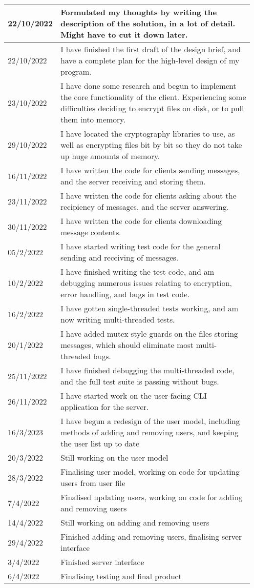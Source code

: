 \documentclass{article}
\begin{document}
{\begin{longtable}{p{}p{}}
\midrule
22/10/2022 & Formulated my thoughts by writing the description of the solution, in a lot of detail. Might have to cut it down later.\\
\midrule
22/10/2022 & I have finished the first draft of the design brief, and have a complete plan for the high-level design of my program.\\
\midrule
23/10/2022 & I have done some research and begun to implement the core functionality of the client. Experiencing some difficulties deciding to encrypt files on disk, or to pull them into memory.\\
\midrule
29/10/2022 & I have located the cryptography libraries to use, as well as encrypting files bit by bit so they do not take up huge amounts of memory.\\
\midrule
16/11/2022 & I have written the code for clients sending messages, and the server receiving and storing them.\\
\midrule
23/11/2022 & I have written the code for clients asking about the recipiency of messages, and the server answering.\\
\midrule
30/11/2022 & I have written the code for clients downloading message contents.\\
\midrule
05/2/2022 & I have started writing test code for the general sending and receiving of messages.\\
\midrule
10/2/2022 & I have finished writing the test code, and am debugging numerous issues relating to encryption, error handling, and bugs in test code.\\
\midrule
16/2/2022 & I have gotten single-threaded tests working, and am now writing multi-threaded tests.\\
\midrule
20/1/2022 & I have added mutex-style guards on the files storing messages, which should eliminate most multi-threaded bugs.\\
\midrule
25/11/2022 & I have finished debugging the multi-threaded code, and the full test suite is passing without bugs.\\
\midrule
26/11/2022 & I have started work on the user-facing CLI application for the server.\\
\midrule
16/3/2023 & I have begun a redesign of the user model, including methods of adding and removing users, and keeping the user list up to date\\
\midrule
20/3/2022 & Still working on the user model\\
\midrule
28/3/2022 & Finalising user model, working on code for updating users from user file\\
\midrule
7/4/2022 & Finalised updating users, working on code for adding and removing users\\
\midrule
14/4/2022 & Still working on adding and removing users\\
\midrule
29/4/2022 & Finished adding and removing users, finalising server interface\\
\midrule
3/4/2022 & Finished server interface\\
\midrule
6/4/2022 & Finalising testing and final product\\
\bottomrule
\end{longtable}
}
\end{document}
